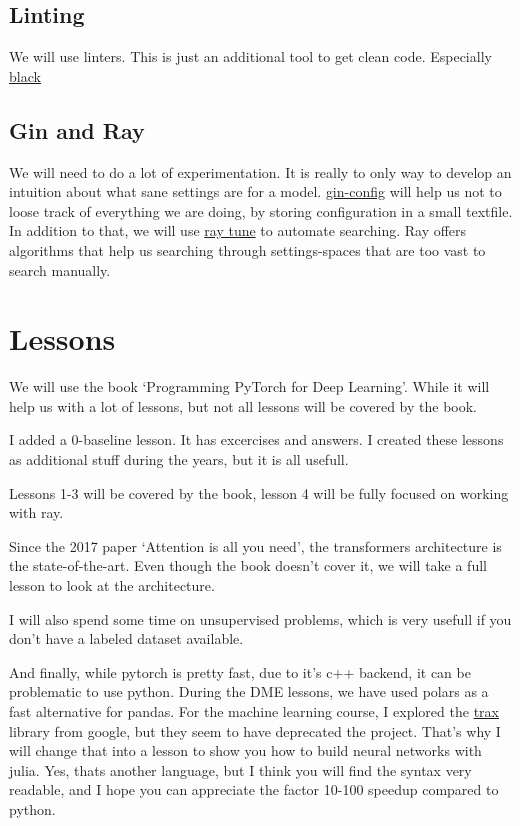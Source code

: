 \documentclass[10pt]{article}
\begin{document}
\subsection{Linting}
We will use linters. This is just an additional tool to get clean code. Especially
\href{https://github.com/psf/black}{black}
\subsection{Gin and Ray}
We will need to do a lot of experimentation. It is really to only way to develop an intuition 
about what sane settings are for a model.
\href{https://github.com/google/gin-config}{gin-config} will help us not to loose track of
everything we are doing, by storing configuration in a small textfile. In addition to that,
we will use \href{https://docs.ray.io/en/latest/tune/index.html}{ray tune} to automate searching.
Ray offers algorithms that help us searching through settings-spaces that are too vast to search manually.

\section{Lessons}
We will use the book  `Programming PyTorch for Deep Learning'. 
While it will help us with a lot of lessons, but not all lessons will be covered by the book.

I added a 0-baseline lesson. It has excercises and answers. I created these lessons as
additional stuff during the years, but it is all usefull.

Lessons 1-3 will be covered by the book, lesson 4 will be fully focused on working with ray.

Since the 2017 paper `Attention is all you need', the transformers architecture is the state-of-the-art.
Even though the book doesn't cover it, we will take a full lesson to look at the architecture.

I will also spend some time on unsupervised problems, which is very usefull if you don't have
a labeled dataset available.

And finally, while pytorch is pretty fast, due to it's c++ backend, it can be problematic to use python.
During the DME lessons, we have used polars as a fast alternative for pandas. For the machine
learning course, I explored the \href{https://github.com/google/trax}{trax} library from
google, but they seem to have deprecated the project. That's why I will change that into a lesson to
show you how to build neural networks with julia. Yes, thats another language, but I think
you will find the syntax very readable, and I hope you can appreciate the factor 10-100 speedup compared to python.















\end{document}
